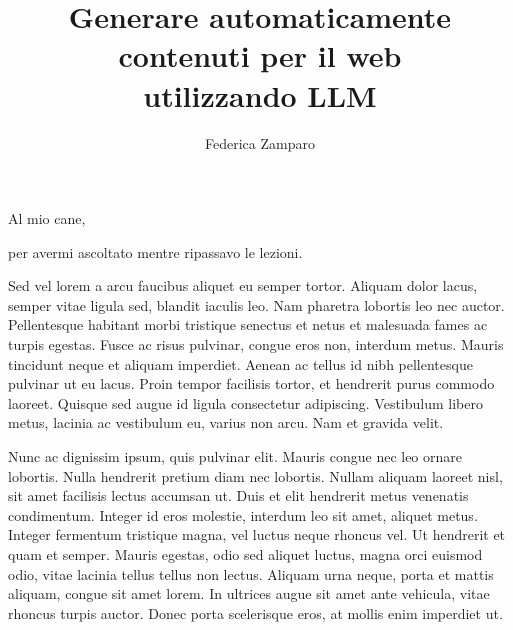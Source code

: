 \documentclass[target=mst,aauheader=,style=]{thud}
\title{Generare automaticamente contenuti per il web \\ utilizzando LLM}
\author{Federica Zamparo}
\begin{document}
\maketitle

\begin{dedication}
	Al mio cane,\par per avermi ascoltato mentre ripassavo le lezioni.
\end{dedication}

\acknowledgements
Sed vel lorem a arcu faucibus aliquet eu semper tortor. Aliquam dolor lacus, semper vitae ligula sed, blandit iaculis leo. Nam pharetra lobortis leo nec auctor. Pellentesque habitant morbi tristique senectus et netus et malesuada fames ac turpis egestas. Fusce ac risus pulvinar, congue eros non, interdum metus. Mauris tincidunt neque et aliquam imperdiet. Aenean ac tellus id nibh pellentesque pulvinar ut eu lacus. Proin tempor facilisis tortor, et hendrerit purus commodo laoreet. Quisque sed augue id ligula consectetur adipiscing. Vestibulum libero metus, lacinia ac vestibulum eu, varius non arcu. Nam et gravida velit.

\abstract
Nunc ac dignissim ipsum, quis pulvinar elit. Mauris congue nec leo ornare lobortis. Nulla hendrerit pretium diam nec lobortis. Nullam aliquam laoreet nisl, sit amet facilisis lectus accumsan ut. Duis et elit hendrerit metus venenatis condimentum. Integer id eros molestie, interdum leo sit amet, aliquet metus. Integer fermentum tristique magna, vel luctus neque rhoncus vel. Ut hendrerit et quam et semper. Mauris egestas, odio sed aliquet luctus, magna orci euismod odio, vitae lacinia tellus tellus non lectus. Aliquam urna neque, porta et mattis aliquam, congue sit amet lorem. In ultrices augue sit amet ante vehicula, vitae rhoncus turpis auctor. Donec porta scelerisque eros, at mollis enim imperdiet ut. 

\tableofcontents



\mainmatter

\end{document}
